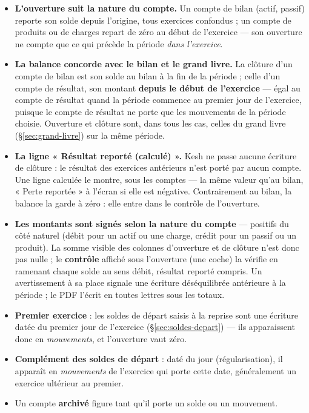 \documentclass[a4paper,11pt,oneside]{article}
\begin{document}
\begin{itemize}
    \item \textbf{L'ouverture suit la nature du compte.} Un compte de bilan (actif, passif) reporte son solde depuis
        l'origine, tous exercices confondus ; un compte de produits ou de charges repart de zéro au début de
        l'exercice — son ouverture ne compte que ce qui précède la période \emph{dans l'exercice}.
    \item \textbf{La balance concorde avec le bilan et le grand livre.} La clôture d'un compte de bilan est son solde au
        bilan à la fin de la période ; celle d'un compte de résultat, son montant \textbf{depuis le début de l'exercice} —
        égal au compte de résultat quand la période commence au premier jour de l'exercice, puisque le compte de
        résultat ne porte que les mouvements de la période choisie. Ouverture et clôture sont, dans tous les cas,
        celles du grand livre (\S\ref{sec:grand-livre}) sur la même période.
    \item \textbf{La ligne « Résultat reporté (calculé) ».} Kesh ne passe aucune écriture de clôture : le résultat des
        exercices antérieurs n'est porté par aucun compte. Une ligne calculée le montre, sous les comptes — la même
        valeur qu'au bilan, « Perte reportée » à l'écran si elle est négative. Contrairement au bilan, la balance la
        garde à zéro : elle entre dans le contrôle de l'ouverture.
    \item \textbf{Les montants sont signés selon la nature du compte} — positifs du côté naturel (débit pour un actif ou
        une charge, crédit pour un passif ou un produit). La somme visible des colonnes d'ouverture et de clôture n'est
        donc pas nulle ; le \textbf{contrôle} affiché sous l'ouverture (une coche) la vérifie en ramenant chaque solde au sens débit, résultat
        reporté compris. Un avertissement à sa place signale une écriture déséquilibrée antérieure à la période ; le PDF
        l'écrit en toutes lettres sous les totaux.
    \item \textbf{Premier exercice} : les soldes de départ saisis à la reprise sont une écriture datée du premier jour
        de l'exercice (\S\ref{sec:soldes-depart}) — ils apparaissent donc en \emph{mouvements}, et l'ouverture vaut zéro.
    \item \textbf{Complément des soldes de départ} : daté du jour (régularisation), il apparaît en \emph{mouvements} de
        l'exercice qui porte cette date, généralement un exercice ultérieur au premier.
    \item Un compte \textbf{archivé} figure tant qu'il porte un solde ou un mouvement.
\end{itemize}
\end{document}
